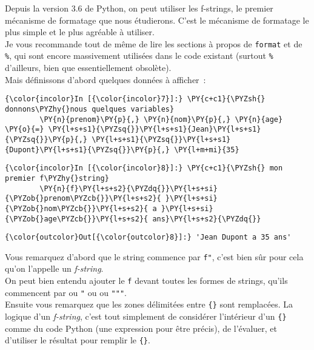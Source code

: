     Depuis la version 3.6 de Python, on peut utiliser les f-strings, le
premier mécanisme de formatage que nous étudierons. C'est le mécanisme
de formatage le plus simple et le plus agréable à utiliser.\\

Je vous recommande tout de même de lire les sections à propos de
\texttt{format} et de \texttt{\%}, qui sont encore massivement utilisées
dans le code existant (surtout \texttt{\%} d'ailleurs, bien que
essentiellement obsolète).\\

    Mais définissons d'abord quelques données à afficher~:

    \begin{Verbatim}[commandchars=\\\{\}]
{\color{incolor}In [{\color{incolor}7}]:} \PY{c+c1}{\PYZsh{} donnons\PYZhy{}nous quelques variables}
        \PY{n}{prenom}\PY{p}{,} \PY{n}{nom}\PY{p}{,} \PY{n}{age} \PY{o}{=} \PY{l+s+s1}{\PYZsq{}}\PY{l+s+s1}{Jean}\PY{l+s+s1}{\PYZsq{}}\PY{p}{,} \PY{l+s+s1}{\PYZsq{}}\PY{l+s+s1}{Dupont}\PY{l+s+s1}{\PYZsq{}}\PY{p}{,} \PY{l+m+mi}{35}
\end{Verbatim}


    \begin{Verbatim}[commandchars=\\\{\}]
{\color{incolor}In [{\color{incolor}8}]:} \PY{c+c1}{\PYZsh{} mon premier f\PYZhy{}string}
        \PY{n}{f}\PY{l+s+s2}{\PYZdq{}}\PY{l+s+si}{\PYZob{}prenom\PYZcb{}}\PY{l+s+s2}{ }\PY{l+s+si}{\PYZob{}nom\PYZcb{}}\PY{l+s+s2}{ a }\PY{l+s+si}{\PYZob{}age\PYZcb{}}\PY{l+s+s2}{ ans}\PY{l+s+s2}{\PYZdq{}}
\end{Verbatim}


\begin{Verbatim}[commandchars=\\\{\}]
{\color{outcolor}Out[{\color{outcolor}8}]:} 'Jean Dupont a 35 ans'
\end{Verbatim}
            
    Vous remarquez d'abord que le string commence par \texttt{f"}, c'est
bien sûr pour cela qu'on l'appelle un \emph{f-string}.\\

On peut bien entendu ajouter le \texttt{f} devant toutes les formes de
strings, qu'ils commencent par \texttt{\textquotesingle{}} ou \texttt{"}
ou \texttt{\textquotesingle{}\textquotesingle{}\textquotesingle{}} ou
\texttt{"""}.\\

    Ensuite vous remarquez que les zones délimitées entre \texttt{\{\}} sont
remplacées. La logique d'un \emph{f-string}, c'est tout simplement de
considérer l'intérieur d'un \texttt{\{\}} comme du code Python (une
expression pour être précis), de l'évaluer, et d'utiliser le résultat
pour remplir le \texttt{\{\}}.\\

